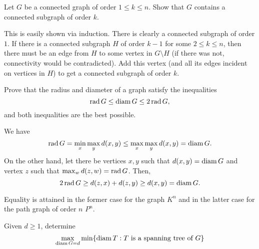 \begin{solution}

\end{solution}

\begin{exercise}
Let $G$ be a connected graph of order $1\leq k\leq n$. Show that $G$ contains a connected subgraph of order $k$.
\end{exercise}

\begin{solution}
This is easily shown via induction. There is clearly a connected subgraph of order $1$. If there is a connected subgraph $H$ of order $k-1$ for some $2\leq k\leq n$, then there must be an edge from $H$ to some vertex in $G\setminus H$ (if there was not, connectivity would be contradicted). Add this vertex (and all its edges incident on vertices in $H$) to get a connected subgraph of order $k$.
\end{solution}

\begin{exercise}
Prove that the radius and diameter of a graph satisfy the inequalities
$$\operatorname{rad} G\leq \operatorname{diam} G\leq 2\operatorname{rad} G,$$
and both inequalities are the best possible.
\end{exercise}

\begin{solution}
We have
$$\operatorname{rad} G = \min_x\max_y d(x,y)\leq \max_x\max_y d(x,y) = \operatorname{diam} G.$$
On the other hand, let there be vertices $x,y$ such that $d(x,y)=\operatorname{diam} G$ and vertex $z$ such that $\max_w d(z,w) = \operatorname{rad} G$. Then,
$$2\operatorname{rad} G\geq d(z,x)+d(z,y)\geq d(x,y) = \operatorname{diam} G.$$

Equality is attained in the former case for the graph $K^n$ and in the latter case for the path graph of order $n$ $P^n$.
\end{solution}

\begin{exercise}
Given $d\geq 1$, determine
$$\max_{\operatorname{diam} G=d}\min\{\operatorname{diam} T: T\text{ is a spanning tree of }G\}$$
\end{exercise}
\begin{solution}

\end{solution}
